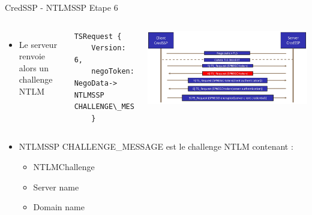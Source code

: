 \documentclass{beamer}
\begin{document}
\begin{frame}[fragile]{CredSSP - NTLMSSP Etape 6}
	 \begin{columns}[T]
	 	\begin{itemize}
	 	\item Le serveur renvoie alors un challenge NTLM
	 	\end{itemize}
	 \begin{lstlisting}[frame=single,basicstyle=\tiny]
TSRequest {
	Version:     6,
	negoToken:   NegoData-> NTLMSSP CHALLENGE\_MESSAGE
	}
	\end{lstlisting}
	 \includegraphics[scale=0.07]{step6.jpg}
	 \end{columns}
	 
	 \begin{itemize}
	 	\item NTLMSSP CHALLENGE\_MESSAGE est le challenge NTLM contenant :
	 		\begin{itemize}
	 		\item NTLMChallenge
	 		\item Server name
	 		\item Domain name
	 		\end{itemize}
	 	\end{itemize}
\end{frame}
\end{document}
